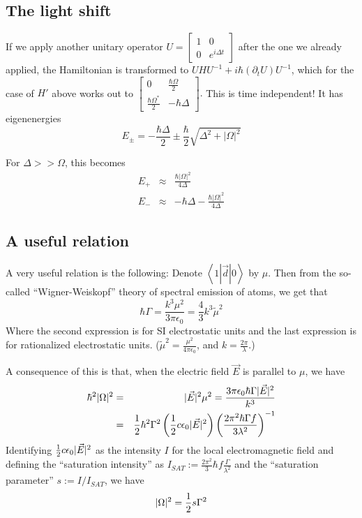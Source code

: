 \documentclass[aps,twocolumn,prb,floatfix,amsmath,amssymb,groupedaddress]{revtex4}
\begin{document}
\subsection{The light shift}
If we apply another unitary operator $U = 
\begin{bmatrix}
1 & 0 \\
0 & e^{i\Delta t}
\end{bmatrix}
$ after the one we already applied, the Hamiltonian is transformed to $UHU^{-1} + i\hbar(\partial_t U) U^{-1}$, which for the case of $H'$ above works out to $
\begin{bmatrix}
0 & \frac{\hbar\Omega}{2} \\
\frac{\hbar\Omega^*}{2} & -\hbar\Delta 
\end{bmatrix}.
$  This is time independent!  It has eigenenergies
\begin{equation}
E_{\pm} = -\frac{\hbar\Delta}{2} \pm \frac{\hbar}{2} \sqrt{\Delta^2 + |\Omega|^2}
\end{equation}

For $\Delta >> \Omega$, this becomes 
\begin{eqnarray}
E_{+} & \approx &  \frac{\hbar|\Omega|^2}{4\Delta}\\
E_{-} & \approx &  -\hbar\Delta - \frac{\hbar |\Omega|^2}{4\Delta}
\label{approxLightShift}
\end{eqnarray}

\subsection{A useful relation}
A very useful relation is the following:  Denote $\left<1|\vec{d}|0\right>$ by ${\mu}$.  Then from the so-called ``Wigner-Weiskopf'' theory of spectral emission of atoms, we get that 
\begin{equation}
\hbar\Gamma = \frac{k^3\mu^2}{3\pi\epsilon_0} = \frac{4}{3}k^3\tilde{\mu}^2
\end{equation}
Where the second expression is for SI electrostatic units and the last expression is for rationalized electrostatic units.  ($\tilde{\mu}^2 = \frac{\mu^2}{4\pi\epsilon_0}$, and $k = \frac{2\pi}{\lambda}$.)

A consequence of this is that, when the electric field $\vec{E}$ is parallel to $\mu$, we have 
\begin{eqnarray*}
\hbar^2|\Omega|^2 & = & |\vec{E}|^2\mu^2 = \frac{3\pi\epsilon_0 \hbar\Gamma |\vec{E}|^2}{k^3} \\
& = & {\frac{1}{2}}\hbar^2\Gamma^2 \left({\frac{1}{2}} c \epsilon_0|\vec{E}|^2\right) \left(\frac{2\pi^2\hbar\Gamma f}{3\lambda^2}\right)^{-1}
\end{eqnarray*}
Identifying ${\frac{1}{2}} c\epsilon_0 |\vec{E}|^2$ as the intensity $I$ for the local electromagnetic field and defining the ``saturation intensity'' as $I_{SAT}:= \frac{2\pi^2}{3}\hbar f \frac{\Gamma}{\lambda^2}$ and the ``saturation parameter'' $s:=I/I_{SAT}$, we have 
\begin{equation}
|\Omega|^2 = {\frac{1}{2}} s \Gamma^2
\label{usefulRelation}
\end{equation}
\end{document}
